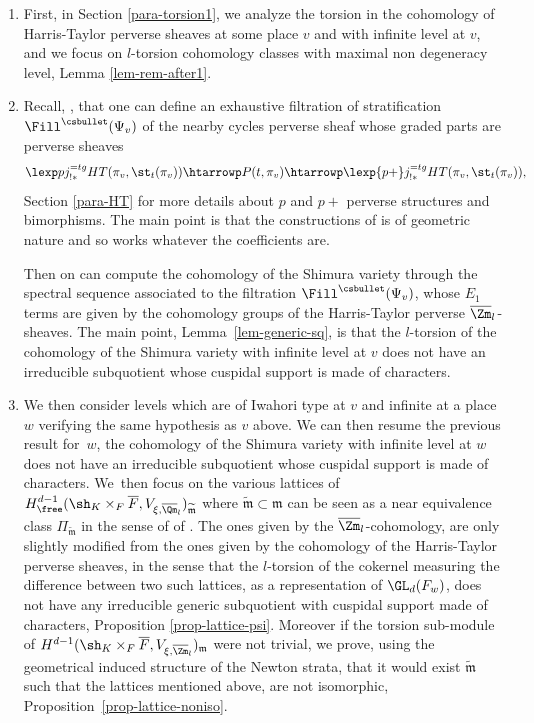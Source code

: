 \begin{enumerate}
\item
First, in Section \ref{para-torsion1}, we analyze the torsion in the
cohomology of Harris-Taylor perverse sheaves at some place
$v$ and with infinite level at $v$, and we focus on $l$-torsion cohomology
classes with maximal non degeneracy level, \cf Lemma \ref{lem-rem-after1}.

\item
Recall, \cf \cite{boyer-torsion}, that one can define an exhaustive filtration
of stratification $\Fill^{\csbullet}(\Psi_v)$ of the nearby cycles perverse sheaf
whose graded parts are perverse sheaves
\[
\lexp p j^{=tg}_{!*} HT(\pi_v,\st_t(\pi_v)) \htarrowp P(t,\pi_v) \htarrowp
\lexp {p+} j^{=tg}_{!*} HT(\pi_v,\st_t(\pi_v)),
\]
\cf Section \ref{para-HT} for more details about $p$ and $p+$ perverse structures
and bimorphisms. The main point is that the constructions of \cite{boyer-torsion}
is of geometric nature and so works whatever the coefficients are.

Then on can
compute the cohomology of the Shimura variety through the
spectral sequence associated to the filtration
$\Fill^{\csbullet}(\Psi_v)$, whose
$E_1$ terms are given by the cohomology groups of the
Harris-Taylor perverse $\overline \Zm_l$-sheaves.
The main point, \cf Lemma~\ref{lem-generic-sq}, is that the $l$-torsion of the
cohomology of the Shimura variety with infinite level at $v$ does not have
an irreducible subquotient whose cuspidal support is made of characters.

\item
We then consider levels which are of Iwahori type at $v$ and infinite
at a place~$w$ verifying the same
hypothesis as $v$ above. We can then resume the previous result for~$w$, \ie the cohomology of the Shimura variety with infinite level at $w$ does not have
an irreducible subquotient whose cuspidal support is made of characters.
We~then focus on the various
lattices of $H^{d-1}_{\free}(\sh_{K} \times_F \overline F,V_{\xi,\overline \Qm_l})_{\widetilde{\mathfrak m}}$ where $\widetilde{\mathfrak m} \subset
\mathfrak m$ can be seen as a near equivalence class $\Pi_{\widetilde{\mathfrak m}}$
in the sense of of \cite{y-t}. The ones given by the
$\overline \Zm_l$\nobreakdash-cohomology,
are only slightly modified from the ones given by the cohomology of the
Harris-Taylor perverse sheaves, in the sense that the $l$-torsion of the
cokernel measuring the difference between two such lattices, as a representation
of $\GL_d(F_w)$, does not have any
irreducible generic subquotient with cuspidal
support made of characters, \cf Proposition \ref{prop-lattice-psi}.
Moreover if the torsion sub-module of
$H^{d-1}(\sh_{K} \times_F \overline F,V_{\xi,\overline \Zm_l})_{\mathfrak m}$ were not trivial, we prove, using the geometrical induced structure of the
Newton strata, that it would exist $\widetilde{\mathfrak m}$
such that the lattices mentioned above, are not isomorphic, \cf Proposition~\ref{prop-lattice-noniso}.


\end{enumerate}
